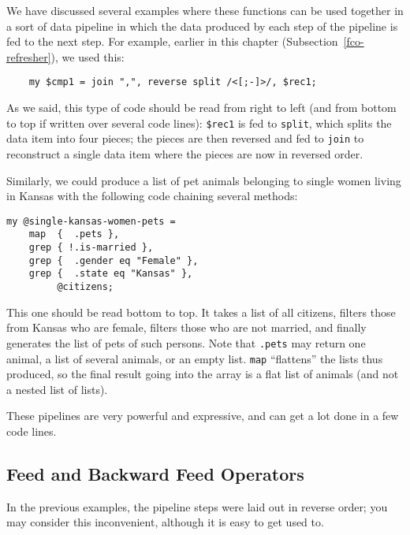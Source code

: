 We have discussed several examples where these functions can 
be used together in a sort of data pipeline in which 
the data produced by each step of the pipeline is fed 
to the next step. For example, earlier in this chapter 
(Subsection~\ref{fco-refresher}), we used this:

\begin{verbatim}
    my $cmp1 = join ",", reverse split /<[;-]>/, $rec1;
\end{verbatim}
 
 
 

As we said, this type of code should be read from right 
to left (and from bottom to top if written over several 
code lines): \verb'$rec1' is fed to {\tt split}, which 
splits the data item into four pieces; the pieces are then 
reversed and fed to {\tt join} to reconstruct a single 
data item where the pieces are now in reversed order.

Similarly, we could produce a list of pet animals belonging 
to single women living in Kansas with the following code 
chaining several methods:

\begin{verbatim}
my @single-kansas-women-pets =
    map  {  .pets },
    grep { !.is-married },
    grep {  .gender eq "Female" },
    grep {  .state eq "Kansas" },
         @citizens;
\end{verbatim}
 
 

This one should be read bottom to top. It takes a list 
of all citizens, filters those from Kansas who are female, 
filters those who are not married, and finally generates 
the list of pets of such persons. Note that \verb'.pets' 
may return one animal, a list of several animals, or an 
empty list. \verb'map' ``flattens'' the lists thus produced, 
so the final result going into the array is a flat list of 
animals (and not a nested list of lists).

These pipelines are very powerful and expressive, and 
can get a lot done in a few code lines.

\subsection{Feed and Backward Feed Operators}

In the previous examples, the pipeline steps were laid out in reverse 
order; you may consider this inconvenient, although it is 
easy to get used to.

